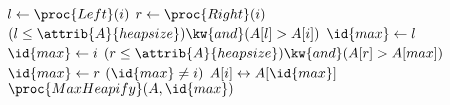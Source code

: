 \begin{codebox}
\li $l \gets \proc{Left}(i)$
\li $r \gets \proc{Right}(i)$
\li \If $(l \leq \attrib{A}{heapsize}) \kw{ and } (A[l] > A[i])$
\li 	\Then
			$\id{max} \gets l$
\li		\Else 
\li			$\id{max} \gets i$			
		\End
\li \If $(r \leq \attrib{A}{heapsize}) \kw{ and } (A[r] > A[max])$
\li 	\Then
			$\id{max} \gets r$
		\End
\li \If $(\id{max} \neq i)$
\li 	\Then 
			$A[i] \leftrightarrow A[\id{max}]$
\li			$\proc{MaxHeapify}(A,\id{max})$
		\End
\end{codebox}